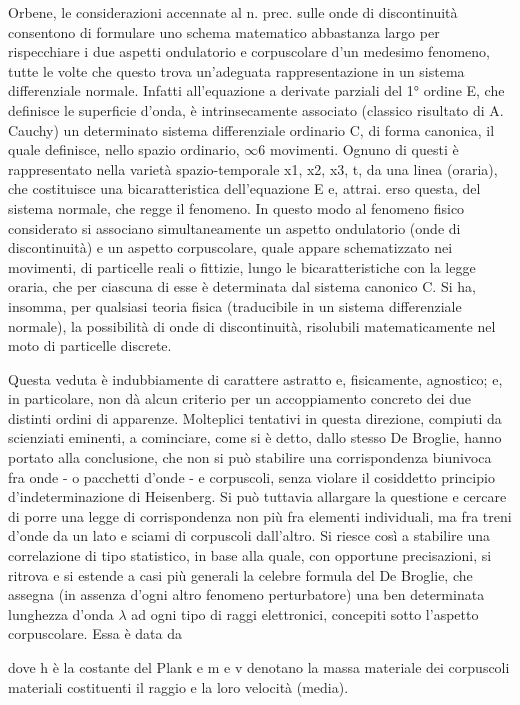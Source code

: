 \documentclass[a4paper]{article}
\begin{document}
Orbene, le considerazioni accennate al n. prec. sulle onde di discontinuità consentono di formulare uno schema matematico abbastanza largo per rispecchiare i due aspetti ondulatorio e corpuscolare d'un medesimo fenomeno, tutte le volte che questo trova un'adeguata rappresentazione in un sistema differenziale normale. Infatti all'equazione a derivate parziali del 1° ordine E, che definisce le superficie d'onda, è intrinsecamente associato (classico risultato di A. Cauchy) un determinato sistema differenziale ordinario C, di forma canonica, il quale definisce, nello spazio ordinario, $\infty$6 movimenti. Ognuno di questi è rappresentato nella varietà spazio-temporale x1, x2, x3, t, da una linea (oraria), che costituisce una bicaratteristica dell'equazione E e, attrai. erso questa, del sistema normale, che regge il fenomeno. In questo modo al fenomeno fisico considerato si associano simultaneamente un aspetto ondulatorio (onde di discontinuità) e un aspetto corpuscolare, quale appare schematizzato nei movimenti, di particelle reali o fittizie, lungo le bicaratteristiche con la legge oraria, che per ciascuna di esse è determinata dal sistema canonico C. Si ha, insomma, per qualsiasi teoria fisica (traducibile in un sistema differenziale normale), la possibilità di onde di discontinuità, risolubili matematicamente nel moto di particelle discrete.

Questa veduta è indubbiamente di carattere astratto e, fisicamente, agnostico; e, in particolare, non dà alcun criterio per un accoppiamento concreto dei due distinti ordini di apparenze. Molteplici tentativi in questa direzione, compiuti da scienziati eminenti, a cominciare, come si è detto, dallo stesso De Broglie, hanno portato alla conclusione, che non si può stabilire una corrispondenza biunivoca fra onde - o pacchetti d'onde - e corpuscoli, senza violare il cosiddetto principio d'indeterminazione di Heisenberg. Si può tuttavia allargare la questione e cercare di porre una legge di corrispondenza non più fra elementi individuali, ma fra treni d'onde da un lato e sciami di corpuscoli dall'altro. Si riesce così a stabilire una correlazione di tipo statistico, in base alla quale, con opportune precisazioni, si ritrova e si estende a casi più generali la celebre formula del De Broglie, che assegna (in assenza d'ogni altro fenomeno perturbatore) una ben determinata lunghezza d'onda $\lambda$ ad ogni tipo di raggi elettronici, concepiti sotto l'aspetto corpuscolare. Essa è data da

dove h è la costante del Plank e m e v denotano la massa materiale dei corpuscoli materiali costituenti il raggio e la loro velocità (media).
\end{document}
